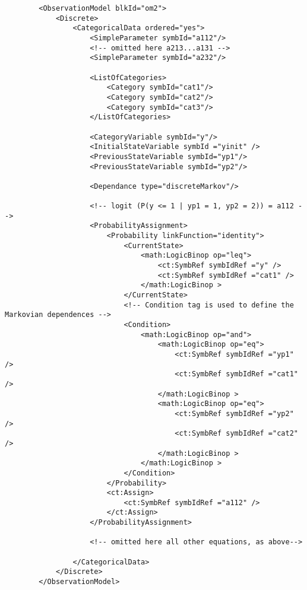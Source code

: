 \lstset{language=XML}
\begin{lstlisting}
        <ObservationModel blkId="om2">
            <Discrete>
                <CategoricalData ordered="yes">
                    <SimpleParameter symbId="a112"/>
                    <!-- omitted here a213...a131 -->
                    <SimpleParameter symbId="a232"/>
                    
                    <ListOfCategories> 
                        <Category symbId="cat1"/>
                        <Category symbId="cat2"/>
                        <Category symbId="cat3"/>
                    </ListOfCategories>
                    
                    <CategoryVariable symbId="y"/>
                    <InitialStateVariable symbId ="yinit" />
                    <PreviousStateVariable symbId="yp1"/>
                    <PreviousStateVariable symbId="yp2"/>
                    
                    <Dependance type="discreteMarkov"/>

                    <!-- logit (P(y <= 1 | yp1 = 1, yp2 = 2)) = a112 -->
                    <ProbabilityAssignment>
                        <Probability linkFunction="identity">
                            <CurrentState>
                                <math:LogicBinop op="leq">
                                    <ct:SymbRef symbIdRef ="y" />
                                    <ct:SymbRef symbIdRef ="cat1" />
                                </math:LogicBinop >
                            </CurrentState>
                            <!-- Condition tag is used to define the Markovian dependences -->
                            <Condition>
                                <math:LogicBinop op="and">
                                    <math:LogicBinop op="eq">
                                        <ct:SymbRef symbIdRef ="yp1" />
                                        <ct:SymbRef symbIdRef ="cat1" />
                                    </math:LogicBinop >
                                    <math:LogicBinop op="eq">
                                        <ct:SymbRef symbIdRef ="yp2" />
                                        <ct:SymbRef symbIdRef ="cat2" />
                                    </math:LogicBinop >
                                </math:LogicBinop >
                            </Condition>
                        </Probability>
                        <ct:Assign>
                            <ct:SymbRef symbIdRef ="a112" />
                        </ct:Assign>
                    </ProbabilityAssignment>
                    
                    <!-- omitted here all other equations, as above-->
                    
                </CategoricalData>
            </Discrete>
        </ObservationModel>     
\end{lstlisting}

